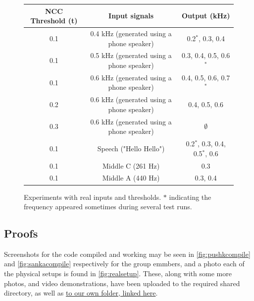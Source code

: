 \begin{figure}[ht]
    \centering
    \def\arraystretch{1.5}
    \setlength\tabcolsep{2em}
    \begin{tabular}{c | c | c}
        NCC Threshold (t)   & Input signals                                 & Output (kHz) \\ \hline
        0.1                 & 0.4 kHz (generated using a phone speaker)     & 0.2$^\ast$, 0.3, 0.4 \\   
        0.1                 & 0.5 kHz (generated using a phone speaker)     & 0.3, 0.4, 0.5, 0.6$^\ast$ \\   
        0.1                 & 0.6 kHz (generated using a phone speaker)     & 0.4, 0.5, 0.6, 0.7$^\ast$ \\   
        0.2                 & 0.6 kHz (generated using a phone speaker)     & 0.4, 0.5, 0.6 \\   
        0.3                 & 0.6 kHz (generated using a phone speaker)     & $\emptyset$ \\  
        0.1                 & Speech ("Hello Hello")                        & 0.2$^\ast$, 0.3, 0.4, 0.5$^\ast$, 0.6 \\   
        0.1                 & Middle C (261 Hz)                             & 0.3 \\   
        0.1                 & Middle A (440 Hz)                             & 0.3, 0.4 
    \end{tabular}
    \captionsetup{justification=centering}
    \caption{Experiments with real inputs and thresholds. $\ast$ indicating the frequency appeared sometimes during several test runs.}
    \label{fig:realexp}

\end{figure}

\subsection{Proofs}

Screenshots for the code compiled and working may be seen in
\autoref{fig:pushkcompile} and \autoref{fig:sankacompile} respectively for the
group emmbers, and a photo each of the physical setups is found in
\autoref{fig:realsetup}. These, along with some more photos, and video
demonstrations, have been uploaded to the required shared directory, as well as
\href{https://drive.google.com/drive/folders/1jjNn4WWWuB7WvTU04xIGaotz5W_Lfz55?usp=sharing}{to
our own folder, linked here}.

